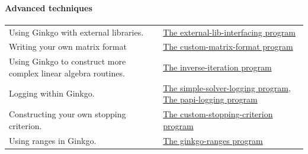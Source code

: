 \paragraph*{{\bfseries Advanced techniques}}

\tabulinesep=1mm
\begin{longtabu} spread 0pt [c]{*{2}{|X[-1]}|}
\hline
Using Ginkgo with external libraries.  &\hyperlink{external_lib_interfacing}{The external-\/lib-\/interfacing program}  

\\
Writing your own matrix format  &\hyperlink{custom_matrix_format}{The custom-\/matrix-\/format program}  

\\
Using Ginkgo to construct more complex linear algebra routines.  &\hyperlink{inverse_iteration}{The inverse-\/iteration program}  

\\
Logging within Ginkgo.  &\hyperlink{simple_solver_logging}{The simple-\/solver-\/logging program}, \hyperlink{papi_logging}{The papi-\/logging program}  

\\
Constructing your own stopping criterion.  &\hyperlink{custom_stopping_criterion}{The custom-\/stopping-\/criterion program}  

\\
Using ranges in Ginkgo.  &\hyperlink{ginkgo_ranges}{The ginkgo-\/ranges program}   \\
\end{longtabu}
